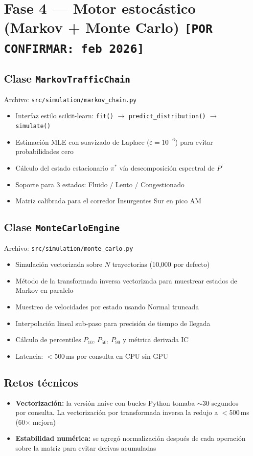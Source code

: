 \documentclass[11pt,a4paper]{article}
\begin{document}
\section{Fase 4 --- Motor estocástico (Markov + Monte Carlo) \texttt{[POR CONFIRMAR: feb 2026]}}

\subsection{Clase \texttt{MarkovTrafficChain}}
Archivo: \texttt{src/simulation/markov\_chain.py}
\begin{itemize}
  \item Interfaz estilo scikit-learn: \texttt{fit()} $\rightarrow$ \texttt{predict\_distribution()} $\rightarrow$ \texttt{simulate()}
  \item Estimación MLE con suavizado de Laplace ($\varepsilon = 10^{-6}$) para evitar probabilidades cero
  \item Cálculo del estado estacionario $\pi^{*}$ vía descomposición espectral de $P^{\top}$
  \item Soporte para 3 estados: Fluido / Lento / Congestionado
  \item Matriz calibrada para el corredor Insurgentes Sur en pico AM
\end{itemize}

\subsection{Clase \texttt{MonteCarloEngine}}
Archivo: \texttt{src/simulation/monte\_carlo.py}
\begin{itemize}
  \item Simulación vectorizada sobre $N$ trayectorias (10{,}000 por defecto)
  \item Método de la transformada inversa vectorizada para muestrear estados de Markov en paralelo
  \item Muestreo de velocidades por estado usando Normal truncada
  \item Interpolación lineal sub-paso para precisión de tiempo de llegada
  \item Cálculo de percentiles $P_{10}$, $P_{50}$, $P_{90}$ y métrica derivada IC
  \item Latencia: $<$500\,ms por consulta en CPU sin GPU
\end{itemize}

\subsection{Retos técnicos}
\begin{itemize}
  \item \textbf{Vectorización:} la versión naive con bucles Python tomaba $\sim$30 segundos por consulta. La vectorización por transformada inversa la redujo a $<$500\,ms (60$\times$ mejora)
  \item \textbf{Estabilidad numérica:} se agregó normalización después de cada operación sobre la matriz para evitar derivas acumuladas
\end{itemize}
\end{document}
